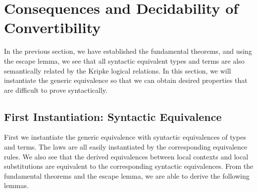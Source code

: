 \section{Consequences and Decidability of Convertibility}

In the previous section, we have established the fundamental theorems, and using the
escape lemma, we see that all syntactic equivalent types and terms are also
semantically related by the Kripke logical relations. %
In this section, we will instantiate the generic equivalence so that we can obtain
desired properties that are difficult to prove syntactically. %

\subsection{First Instantiation: Syntactic Equivalence}

First we instantiate the generic equivalence with syntactic equivalences of types and
terms. %
The laws are all easily instantiated by the corresponding equivalence rules. %
We also see that the derived equivalences between local contexts and local
substitutions are equivalent to the corresponding syntactic equivalences. %
From the fundamental theorems and the escape lemma, we are able to derive the
following lemmas.

